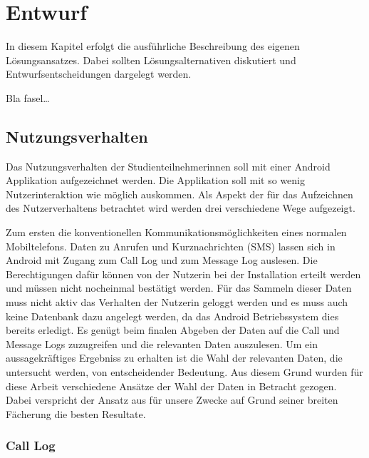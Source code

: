 
\chapter{Entwurf}
\label{ch:Entwurf}
In diesem Kapitel erfolgt die ausführliche Beschreibung des eigenen
Lösungsansatzes. Dabei sollten Lösungsalternativen diskutiert und
Entwurfsentscheidungen dargelegt werden.


Bla fasel\ldots

\section{Nutzungsverhalten}

Das Nutzungsverhalten der Studienteilnehmerinnen soll mit einer Android Applikation aufgezeichnet werden.
Die Applikation soll mit so wenig Nutzerinteraktion wie möglich auskommen.
Als Aspekt der für das Aufzeichnen des Nutzerverhaltens betrachtet wird werden drei verschiedene Wege aufgezeigt.
\par
Zum ersten die konventionellen Kommunikationsmöglichkeiten eines normalen Mobiltelefons.
Daten zu Anrufen und Kurznachrichten (SMS) lassen sich in Android mit Zugang zum Call Log und zum Message Log auslesen.
Die Berechtigungen dafür können von der Nutzerin bei der Installation erteilt werden und müssen nicht nocheinmal bestätigt werden.
Für das Sammeln dieser Daten muss nicht aktiv das Verhalten der Nutzerin geloggt werden und es muss auch keine Datenbank dazu angelegt werden,
da das Android Betriebssystem dies bereits erledigt.
Es genügt beim finalen Abgeben der Daten auf die Call und Message Logs zuzugreifen und die relevanten Daten auszulesen.
Um ein aussagekräftiges Ergebniss zu erhalten ist die Wahl der relevanten Daten, die untersucht werden, von entscheidender Bedeutung. 
Aus diesem Grund wurden für diese Arbeit verschiedene Ansätze der Wahl der Daten in Betracht gezogen. 
Dabei verspricht der Ansatz aus \cite{chittaranjan2011s} für unsere Zwecke auf Grund seiner breiten Fächerung die besten Resultate.
\par

\subsection{Call Log}

